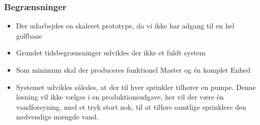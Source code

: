 \subsubsection*{Begrænsninger}
\begin{itemize}
\item Der udarbejdes en skaleret prototype, da vi ikke har adgang til en hel golfbane
\item Grundet tidsbegrænsninger udvikles der ikke et fuldt system 
\item Som minimum skal der produceres funktionel Master og én komplet Enhed
\item Systemet udvikles således, at der til hver sprinkler tilhører en pumpe. Denne løsning vil ikke vælges i en produktionsudgave, her vil der være én vandforsyning, med et tryk stort nok, til at tilføre samtlige sprinklere den nødvendige mængde vand.
\end{itemize}



